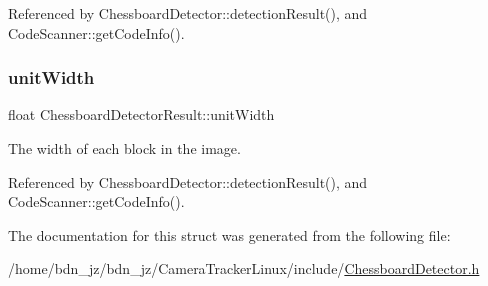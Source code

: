 Referenced by Chessboard\+Detector\+::detection\+Result(), and Code\+Scanner\+::get\+Code\+Info().

\mbox{\label{structChessboardDetectorResult_a967889233f9ea3e34e7b215041105801}} 
\subsubsection{\texorpdfstring{unit\+Width}{unitWidth}}
{\footnotesize\ttfamily float Chessboard\+Detector\+Result\+::unit\+Width}

The width of each block in the image. 

Referenced by Chessboard\+Detector\+::detection\+Result(), and Code\+Scanner\+::get\+Code\+Info().



The documentation for this struct was generated from the following file\+:\begin{DoxyCompactItemize}
\item 
/home/bdn\+\_\+jz/bdn\+\_\+jz/\+Camera\+Tracker\+Linux/include/\hyperlink{ChessboardDetector_8h}{Chessboard\+Detector.\+h}\end{DoxyCompactItemize}
